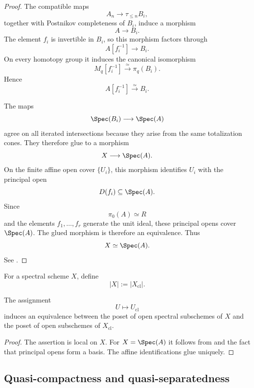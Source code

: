 \begin{proof}
The compatible maps
\[
    A_n
    \longrightarrow
    \tau_{\leq n}B_i,
\]
together with Postnikov completeness of \(B_i\), induce a morphism
\[
    A
    \longrightarrow
    B_i.
\]
The element \(f_i\) is invertible in \(B_i\), so this morphism factors
through
\[
    A[f_i^{-1}]
    \longrightarrow
    B_i.
\]
On every homotopy group it induces the canonical isomorphism
\[
    M_q[f_i^{-1}]
    \xrightarrow{\simeq}
    \pi_q(B_i).
\]
Hence
\[
    A[f_i^{-1}]
    \xrightarrow{\simeq}
    B_i.
\]

The maps
\[
    \Spec(B_i)
    \longrightarrow
    \Spec(A)
\]
agree on all iterated intersections because they arise from the same
totalization cones. They therefore glue to a morphism
\[
    X
    \longrightarrow
    \Spec(A).
\]
On the finite affine open cover \(\{U_i\}\), this morphism identifies
\(U_i\) with the principal open
\[
    D(f_i)
    \subseteq
    \Spec(A).
\]
Since
\[
    \pi_0(A)
    \simeq
    R
\]
and the elements \(f_1,\ldots,f_r\) generate the unit ideal, these
principal opens cover \(\Spec(A)\). The glued morphism is therefore an
equivalence. Thus
\[
    X
    \simeq
    \Spec(A).
\]
See \cite{LurieSAG}.
\end{proof}

\begin{definition}
\label{def:underlying-space-spectral-scheme}
For a spectral scheme $X$, define
\[
    |X|
    :=
    |X_{\mathrm{cl}}|.
\]
\end{definition}

\begin{proposition}
\label{prop:opens-classical-truncation}
The assignment
\[
    U
    \longmapsto
    U_{\mathrm{cl}}
\]
induces an equivalence between the poset of open spectral subschemes of
$X$ and the poset of open subschemes of $X_{\mathrm{cl}}$.
\end{proposition}

\begin{proof}
The assertion is local on $X$. For $X=\Spec(A)$ it follows from
 and the fact that
principal opens form a basis. The affine identifications glue uniquely.
\end{proof}

\subsection{Quasi-compactness and quasi-separatedness}

